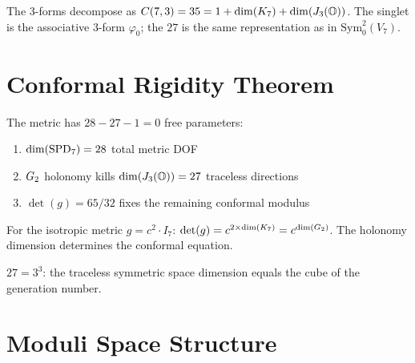 \begin{theorem}[$\Lambda^3(V_7) = 1 \oplus 7 \oplus 27$]\label{thm:lambda3_decomp}
    \leanok
    The 3-forms decompose as $C(7,3) = 35 = 1 + \mathrm{dim}(K_7) + \mathrm{dim}(J_3(\mathbb{O}))$.
    The singlet is the associative 3-form $\varphi_0$; the $27$ is the same representation
    as in $\mathrm{Sym}^2_0(V_7)$.
\end{theorem}

\section{Conformal Rigidity Theorem}

\begin{theorem}\label{thm:conformal_rigidity}
    \leanok
    The metric has $28 - 27 - 1 = 0$ free parameters:
    \begin{enumerate}
        \item $\mathrm{dim}(\mathrm{SPD}_7) = 28$ total metric DOF
        \item $G_2$ holonomy kills $\mathrm{dim}(J_3(\mathbb{O})) = 27$ traceless directions
        \item $\det(g) = 65/32$ fixes the remaining conformal modulus
    \end{enumerate}
\end{theorem}

\begin{theorem}[Conformal exponent = $\opdim(\Gtwo)$]\label{thm:conformal_exponent}
    \leanok
    For the isotropic metric $g = c^2 \cdot I_7$:
    $\det(g) = c^{2 \times \mathrm{dim}(K_7)} = c^{\mathrm{dim}(G_2)}$.
    The holonomy dimension determines the conformal equation.
\end{theorem}

\begin{theorem}[$\opdim(J_3(\mathbb{O})) = N_{\mathrm{gen}}^3$]\label{thm:J3O_Ngen_cubed}
    \leanok
    $27 = 3^3$: the traceless symmetric space dimension equals the cube
    of the generation number.
\end{theorem}

\section{Moduli Space Structure}

